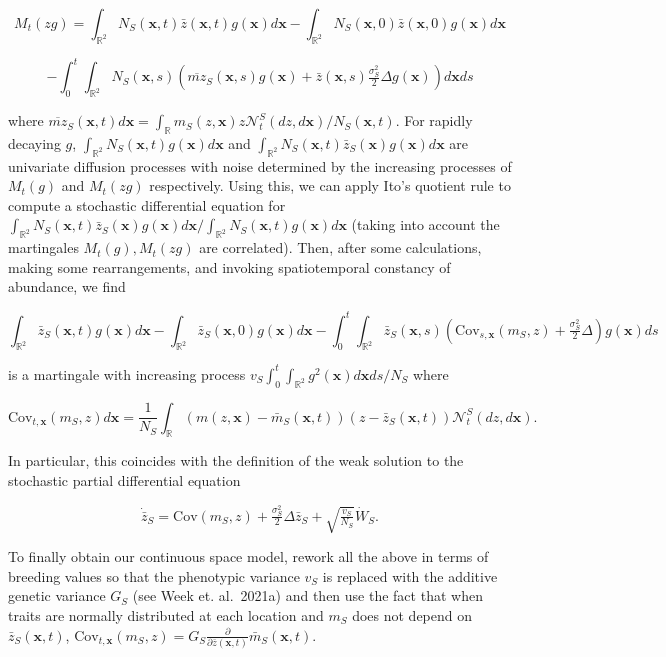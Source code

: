 \documentclass{article}
\begin{document}
\[M_t(zg)=\int_{\mathbb R^2}N_S(\pmb x,t)\bar z(\pmb x,t)g(\pmb x)d\pmb x-\int_{\mathbb R^2}N_S(\pmb x,0)\bar z(\pmb x,0)g(\pmb x)d\pmb x\]

\[-\int_0^t\int_{\mathbb R^2}N_S(\pmb x,s)\left(\overline{m z}_S(\pmb x,s)g(\pmb x)+\bar z(\pmb x,s)\tfrac{\sigma_S^2}{2}\Delta g(\pmb x)\right)d\pmb xds\]

where
\(\overline{mz}_S(\pmb x,t)d\pmb x=\int_{\mathbb R}m_S(z,\pmb x)z\mathscr N_t^S(dz,d\pmb x)/N_S(\pmb x,t)\).
For rapidly decaying \(g\),
\(\int_{\mathbb R^2}N_S(\pmb x,t)g(\pmb x)d\pmb x\) and
\(\int_{\mathbb R^2}N_S(\pmb x,t)\bar z_S(\pmb x)g(\pmb x)d\pmb x\) are
univariate diffusion processes with noise determined by the increasing
processes of \(M_t(g)\) and \(M_t(zg)\) respectively. Using this, we can
apply Ito's quotient rule to compute a stochastic differential equation
for
\(\int_{\mathbb R^2}N_S(\pmb x,t)\bar z_S(\pmb x)g(\pmb x)d\pmb x/\int_{\mathbb R^2}N_S(\pmb x,t)g(\pmb x)d\pmb x\)
(taking into account the martingales \(M_t(g),M_t(zg)\) are correlated).
Then, after some calculations, making some rearrangements, and invoking
spatiotemporal constancy of abundance, we find

\[\int_{\mathbb R^2}\bar z_S(\pmb x,t)g(\pmb x)d\pmb x-\int_{\mathbb R^2}\bar z_S(\pmb x,0)g(\pmb x)d\pmb x-\int_0^t\int_{\mathbb R^2}\bar z_S(\pmb x,s)\left(\mathrm{Cov}_{s,\pmb x}(m_S,z)+\tfrac{\sigma^2_S}{2}\Delta\right)g(\pmb x)ds\]

is a martingale with increasing process
\(v_S\int_0^t\int_{\mathbb R^2}g^2(\pmb x)d\pmb xds/N_S\) where

\[\mathrm{Cov}_{t,\pmb x}(m_S,z)d\pmb x=\frac{1}{N_S}\int_{\mathbb R}(m(z,\pmb x)-\bar m_S(\pmb x,t))(z-\bar z_S(\pmb x,t))\mathscr N_t^S(dz,d\pmb x).\]

In particular, this coincides with the definition of the weak solution
to the stochastic partial differential equation

\[\dot{\bar z}_S=\mathrm{Cov}(m_S,z)+\tfrac{\sigma^2_S}{2}\Delta\bar z_S+\sqrt{\tfrac{v_S}{N_S}}\dot W_S.\]

To finally obtain our continuous space model, rework all the above in
terms of breeding values so that the phenotypic variance \(v_S\) is
replaced with the additive genetic variance \(G_S\) (see Week et.
al.~2021a) and then use the fact that when traits are normally
distributed at each location and \(m_S\) does not depend on
\(\bar z_S(\pmb x,t)\),
\(\mathrm{Cov}_{t,\pmb x}(m_S,z)=G_S\tfrac{\partial}{\partial\bar z(\pmb x,t)}\bar m_S(\pmb x,t)\).
\end{document}
